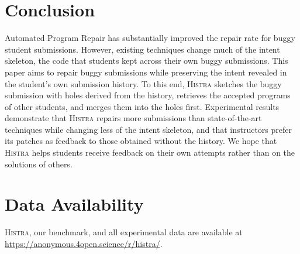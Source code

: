 \documentclass[10pt,conference]{IEEEtran}
\begin{document}
\section{Conclusion}\label{sec:conclusion}

Automated Program Repair has substantially improved the repair rate for buggy student submissions. However, existing techniques change much of the intent skeleton, the code that students kept across their own buggy submissions. This paper aims to repair buggy submissions while preserving the intent revealed in the student's own submission history. To this end, \textsc{Histra} sketches the buggy submission with holes derived from the history, retrieves the accepted programs of other students, and merges them into the holes first. Experimental results demonstrate that \textsc{Histra} repairs more submissions than state-of-the-art techniques while changing less of the intent skeleton, and that instructors prefer its patches as feedback to those obtained without the history. We hope that \textsc{Histra} helps students receive feedback on their own attempts rather than on the solutions of others.

\section*{Data Availability}
\textsc{Histra}, our benchmark, and all experimental data are available at \url{https://anonymous.4open.science/r/histra/}.



\end{document}
